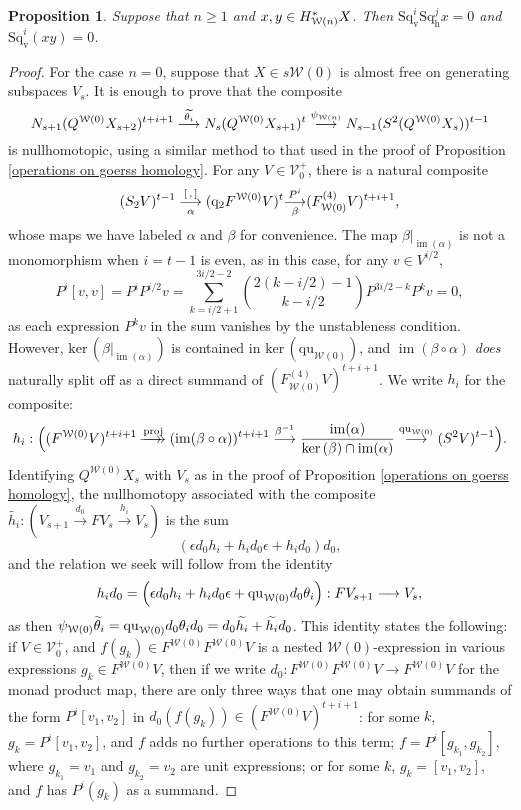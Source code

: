 \documentclass[11pt]{amsart} \renewcommand{\baselinestretch}{1.2}
\theoremstyle{plain}
\newtheorem{prop}[thm]{Proposition}
\numberwithin{equation}{section} %
\theoremstyle{plain}
\newtheorem{prop}[thm]{Proposition}
\numberwithin{equation}{chapter} %
\renewcommand{\ker}{\mathrm{ker}\,}
\DeclareMathOperator{\im}{im}
\renewcommand{\to}{\longrightarrow}
\newcommand{\calV}{\mathcal{V}}
\newcommand{\calw}{\mathcal{W}}
\newcommand{\vect}[2]{\calV^{#1}_{#2}}
\newcommand{\quadratic}{\mathrm{qu}}
\newcommand{\quadgrad}[1]{\mathrm{q}_{#1}}
\newcommand{\epi}{{\,\makebox[0cm][l]{\ensuremath\to}\to{}}}
\newcommand{\mono}{{\to}}
\newcommand{\uver}{^\mathrm{v}}
\newcommand{\dver}{_\mathrm{v}}
\newcommand{\dhor}{_\mathrm{h}}
\newcommand{\Sqh}{\mathrm{Sq}\dhor}
\newcommand{\Sqv}{\mathrm{Sq}\dver}
\newcommand{\deltav}{\delta\uver}
\begin{document}
\begin{Cohomology Operations for W and U}
\begin{prop}
Suppose that $n\geq1$ and $x,y\in H^*_{\smash{\calw(n)}}X$. Then $\Sqv^{i}\Sqh^{j}x=0$ and $\Sqv^i(xy)=0$.
\end{prop}
\begin{proof}
For the case $n=0$, suppose that $X\in s\calw(0)$ is almost free on generating subspaces $V_s$. It is enough to prove that the composite
\[N_{s+1}(Q^{\calw(0)}X_{s+2})^{t+i+1}
\overset{\smash{\widetilde{\theta_i}}}{\to}
N_s(Q^{\calw(0)}X_{s+1})^{t}
\overset{{\psi_{\calw(n)}}}{\to}
N_{s-1}(S^2(Q^{\calw(0)}X_{s}))^{t-1}
\]
is nullhomotopic, using a similar method to that used in the proof of Proposition \ref{operations on goerss homology}. For any $V\in \vect{+}{0}$, there is a natural composite
\[(S_2V)^{t-1}\underset{\smash{\alpha}}{\overset{[\,,\,]}{\to}} (\quadgrad{2}F^{\calw(0)}V)^{t}\underset{\smash{\beta}}{\overset{P^i}{\mono}} (F^{(4)}_{\calw(0)}V)^{t+i+1},\]
whose maps we have labeled $\alpha$ and $\beta$ for convenience.
The map $\beta|_{\im(\alpha)}$ is not a monomorphism when $i=t-1$ is even, as in this case, for any $v\in V^{i/2}$,
\[P^i[v,v]=P^{i}P^{i/2}v=\textstyle\sum_{k=i/2+1}^{3i/2-2}\binom{2(k-i/2)-1}{ k-i/2}P^{3i/2-k}P^kv=0,\]
as each expression $P^kv$ in the sum vanishes by the unstableness condition.
However, $\ker(\beta|_{\im(\alpha)})$ is contained in $\ker(\quadratic_{\calw(0)})$, 
and $\im(\beta\circ\alpha)$ \emph{does} naturally split off as a direct summand of $(F^{(4)}_{\calw(0)}V)^{t+i+1}$.
 We write $h_i$ for the composite:
\[h_{i}:\Bigl((F^{\calw(0)}V)^{t+i+1}\overset{\textup{proj}}{\epi}
(\im(\beta\circ\alpha))^{t+i+1}\overset{\beta^{-1}}{\to}\frac{\im(\alpha)}{\ker(\beta)\cap\im(\alpha)}\overset{\quadratic_{\calw(0)}}{\to}(S^2V)^{t-1}\Bigr).\]
Identifying $Q^{\calw(0)}X_s$ with $V_s$ as in the proof of Proposition \ref{operations on goerss homology}, the nullhomotopy associated with the composite $\widetilde{h_i}:(V_{s+1}\overset{d_0}{\to}FV_s\overset{h_i}{\to}V_s)$ is the sum
\[(\epsilon d_0h_i+h_id_0\epsilon+h_id_0)d_0,\]
and the relation we seek will follow from the identity
\[h_id_0=\Bigl(\epsilon d_0h_i+h_id_0\epsilon+\quadratic_{\calw(0)} d_0\theta_i\Bigr):FV_{s+1}\to V_s,\]
as then $\psi_{\calw(0)}\smash{\widetilde{\theta}_i}=\quadratic_{\calw(0)} d_0\theta_id_0=d_0\widetilde{h_i}+\widetilde{h_i}d_0$. This identity states the following: if $V\in\vect{+}{0}$, and $f(g_k)\in F^{\calw(0)}F^{\calw(0)}V$ is a nested $\calw(0)$-expression in various expressions $g_k\in F^{\calw(0)}V$, then if we write $d_0:F^{\calw(0)}F^{\calw(0)}V\to F^{\calw(0)}V$ for the monad product map, there are only three ways that one may obtain summands of the form $P^i[v_1,v_2]$ in $d_0(f(g_k))\in (F^{\calw(0)}V)^{t+i+1}$: for some $k$, $g_k=P^i[v_1,v_2]$, and $f $ adds no further operations to this term; $f=P^i[g_{k_1},g_{k_2}]$, where $g_{k_1}=v_1$ and $g_{k_2}=v_2$ are unit expressions; or for some $k$, $g_k=[v_1,v_2]$, and  $f$ has $P^i(g_k)$ as a summand.


\end{proof}
\end{Cohomology Operations for W and U}
\end{document}
